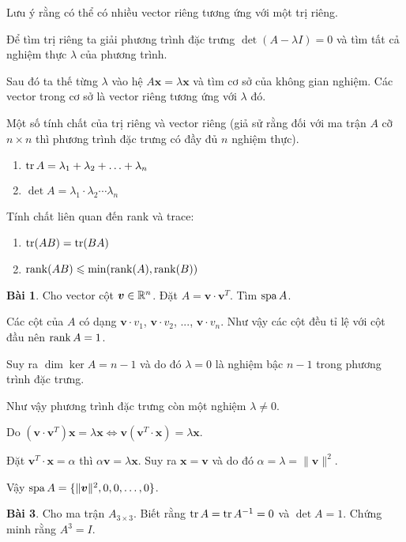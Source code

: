 Lưu ý rằng có thể có nhiều vector riêng tương ứng với một trị riêng.

Để tìm trị riêng ta giải phương trình đặc trưng $\det (A - \lambda I) = 0$ và tìm tất cả nghiệm thực $\lambda$ của phương trình.

Sau đó ta thế từng $\lambda$ vào hệ $A \bm{x} = \lambda \bm{x}$ và tìm cơ sở của không gian nghiệm. Các vector trong cơ sở là vector riêng tương ứng với $\lambda$ đó.

Một số tính chất của trị riêng và vector riêng (giả sử rằng đối với ma trận $A$ cỡ $n \times n$ thì phương trình đặc trưng có đầy đủ $n$ nghiệm thực).

\begin{enumerate}
    \item $\operatorname{tr} A = \lambda_1 + \lambda_2 + \ldots + \lambda_n$
    \item $\det A = \lambda_1 \cdot \lambda_2 \cdots \lambda_n$
\end{enumerate}

Tính chất liên quan đến rank và trace:

\begin{enumerate}
    \item $\operatorname{tr} (AB) = \operatorname{tr} (BA)$
    \item $\operatorname{rank} (AB) \leqslant \min(\operatorname{rank}(A), \operatorname{rank}(B))$
\end{enumerate}

\textbf{Bài 1}. Cho vector cột $\bm{v} \in \mathbb{R}^n$. Đặt $A = \bm{v} \cdot \bm{v}^T$. Tìm $\operatorname{spa} A$.

Các cột của $A$ có dạng $\bm{v} \cdot v_1$, $\bm{v} \cdot v_2$, ..., $\bm{v} \cdot v_n$. Như vậy các cột đều tỉ lệ với cột đầu nên $\operatorname{rank} A = 1$.

Suy ra $\dim \ker A = n-1$ và do đó $\lambda = 0$ là nghiệm bậc $n-1$ trong phương trình đặc trưng.

Như vậy phương trình đặc trưng còn một nghiệm $\lambda \neq 0$.

Do $(\bm{v} \cdot \bm{v}^T) \bm{x} = \lambda \bm{x} \Leftrightarrow \bm{v} (\bm{v}^T \cdot \bm{x}) = \lambda \bm{x}$.

Đặt $\bm{v}^T \cdot \bm{x} = \alpha$ thì $\alpha \bm{v} = \lambda \bm{x}$. Suy ra $\bm{x} = \bm{v}$ và do đó $\alpha = \lambda = \lVert \bm{v} \rVert^2$.

Vậy $\operatorname{spa} A = \{ \lVert \bm{v} \rVert^2, 0, 0, \ldots, 0\}$.

\textbf{Bài 3}. Cho ma trận $A_{3 \times 3}$. Biết rằng $\operatorname{tr} A = \operatorname{tr} A^{-1} = 0$ và $\det A = 1$. Chứng minh rằng $A^3 = I$.

